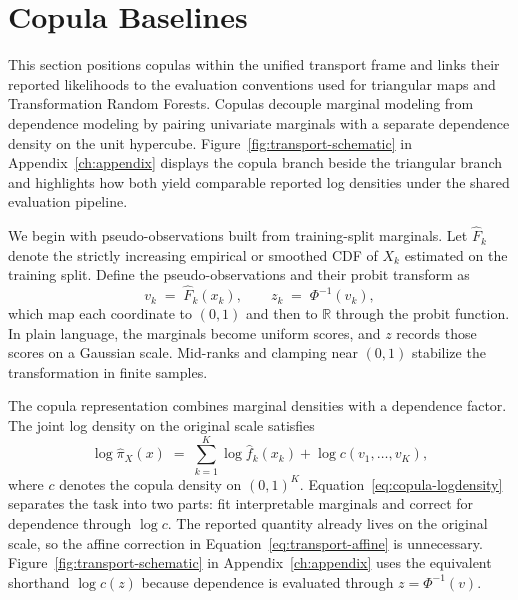 \documentclass[11pt,a4paper,twoside]{book}\usepackage[]{graphicx}\usepackage[]{xcolor}
\begin{document}
\section{Copula Baselines}\label{sec:transport-copula}

This section positions copulas within the unified transport frame and links their reported likelihoods to the evaluation conventions used for triangular maps and Transformation Random Forests. Copulas decouple marginal modeling from dependence modeling by pairing univariate marginals with a separate dependence density on the unit hypercube. Figure~\ref{fig:transport-schematic} in Appendix~\ref{ch:appendix} displays the copula branch beside the triangular branch and highlights how both yield comparable reported log densities under the shared evaluation pipeline.

We begin with pseudo-observations built from training-split marginals. Let $\widehat F_k$ denote the strictly increasing empirical or smoothed CDF of $X_k$ estimated on the training split. Define the pseudo-observations and their probit transform as
\begin{equation}
  v_k \;=\; \widehat F_k(x_k),\qquad z_k \;=\; \Phi^{-1}(v_k),\label{eq:copula-probit}
\end{equation}
which map each coordinate to $(0,1)$ and then to $\mathbb{R}$ through the probit function. In plain language, the marginals become uniform scores, and $z$ records those scores on a Gaussian scale. Mid-ranks and clamping near $(0,1)$ stabilize the transformation in finite samples.

The copula representation combines marginal densities with a dependence factor. The joint log density on the original scale satisfies
\begin{equation}
  \log \widehat \pi_X(x) \;=\; \sum_{k=1}^{K} \log \widehat f_k(x_k) + \log c\!\left(v_1,\ldots,v_K\right),\label{eq:copula-logdensity}
\end{equation}
where $c$ denotes the copula density on $(0,1)^K$. Equation~\eqref{eq:copula-logdensity} separates the task into two parts: fit interpretable marginals and correct for dependence through $\log c$. The reported quantity already lives on the original scale, so the affine correction in Equation~\eqref{eq:transport-affine} is unnecessary. Figure~\ref{fig:transport-schematic} in Appendix~\ref{ch:appendix} uses the equivalent shorthand $\log c(z)$ because dependence is evaluated through $z=\Phi^{-1}(v)$.
\end{document}
